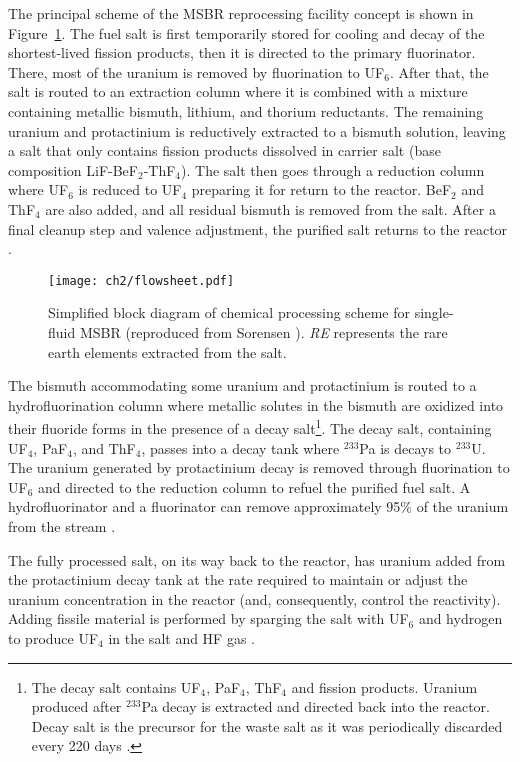 The principal scheme of the \gls{MSBR} reprocessing facility concept is shown 
in Figure~\ref{fig:material_flow}. The fuel salt is first temporarily stored 
for cooling and decay of the shortest-lived fission products, then it is 
directed to the primary fluorinator. There, most of the uranium is removed by 
fluorination to UF$_6$. After that, the salt is routed to an extraction column 
where it is combined with a mixture containing metallic bismuth, lithium, and 
thorium reductants. The remaining uranium and protactinium is  reductively 
extracted to a bismuth solution, leaving a salt that only contains fission 
products dissolved in carrier salt (base composition LiF-BeF$_2$-ThF$_4$). The 
salt then goes through a reduction column where UF$_6$ is reduced to UF$_4$ 
preparing it for return to the reactor. BeF$_2$ and ThF$_4$ are also added, 
and all residual bismuth is removed from the salt. After a final cleanup step 
and valence adjustment, the purified salt returns to the reactor 
\cite{carter_design_1972, sorensen_one-fluid_2006}.

\begin{figure}[htp!] %
	\centering
	\texttt{[image: ch2/flowsheet.pdf]}
	\caption{Simplified block diagram of chemical processing scheme for 
		single-fluid \gls{MSBR} (reproduced from Sorensen 
		\cite{sorensen_one-fluid_2006}). \emph{RE} represents the rare 
		earth elements extracted from the salt.}
	\label{fig:material_flow}
\end{figure}

The bismuth accommodating some uranium and protactinium is routed to a 
hydrofluorination column where metallic solutes in the bismuth are oxidized 
into their fluoride forms in the presence of a decay salt\footnote{The decay 
salt contains UF$_4$, PaF$_4$, ThF$_4$ and fission products. Uranium produced 
after $^{233}$Pa decay is extracted and directed back into the reactor. Decay 
salt is the precursor for the waste salt as it was periodically discarded  
every 220 days \cite{robertson_conceptual_1971}.}. The decay salt, containing 
UF$_4$, PaF$_4$, and ThF$_4$, passes into a decay tank where $^{233}$Pa is 
decays to $^{233}$U. The uranium generated by protactinium decay is removed 
through fluorination to UF$_6$ and directed to the reduction column to refuel 
the purified fuel salt. A  hydrofluorinator and a fluorinator can remove 
approximately 95\% of the uranium from the stream 
\cite{robertson_conceptual_1971}.

The fully processed salt, on its way back to the reactor, has uranium added 
from the protactinium decay tank at the rate required to maintain or adjust 
the uranium concentration in the reactor (and, consequently, control the 
reactivity). Adding fissile material is performed by sparging the salt with 
UF$_6$ and hydrogen to produce UF$_4$ in the salt and HF gas 
\cite{robertson_conceptual_1971}.

